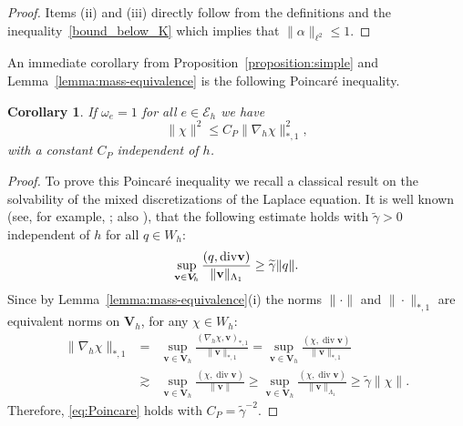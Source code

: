 \documentclass[11pt]{amsart}
\numberwithin{equation}{section}
\newtheorem{corollary}{Corollary}[section]
\theoremstyle{definition}\newtheorem{example}{Example}[section]
\begin{document}
\begin{proof}
Items (ii) and (iii) directly follow from the definitions and
the inequality~\eqref{bound_below_K} which implies that
$\|\alpha\|_{\ell^2}\le 1$.  
\end{proof}

An immediate corollary from Proposition~\ref{proposition:simple}
and Lemma~\ref{lemma:mass-equivalence} is the following  {Poincar\'e } inequality.
\begin{corollary}\label{lemma:Poincare} 
If $\omega_e = 1$ for all $e\in \mathcal{E}_h$ we have 
\begin{equation}\label{eq:Poincare}
\|\chi\|^2 \le C_P\|\nabla_h \chi\|^2_{*,1}, 
\end{equation}
with a constant $C_P$ independent of $h$. 
\end{corollary}
\begin{proof}
  To prove this {Poincar\'e }{} inequality we recall a classical result on the solvability of the
  mixed discretizations of the Laplace equation. It is well known
  (see, for example, \cite[(7.1.28) and Proposition
  5.4.3]{2013BoffiD_BrezziF_FortinM-aa}; also \cite{2002ArnoldD-aa}), that the
  following estimate holds with $\widetilde{\gamma}>0$ independent of
  $h$ for all $q\in W_h$:
\begin{equation}\label{eq:inf-sup-1}
\sup_{{{\mathbf v}}\in {{\boldsymbol V}_{\hspace{-0.2mm}h}}}\frac{(q,{\operatorname{div}} {{\mathbf v}})}{\|{{\mathbf v}}\|_{\Lambda_1}}\ge \widetilde{\gamma}\|q\|. 
\end{equation}
Since by Lemma~\ref{lemma:mass-equivalence}(i) the norms $\|\cdot\|$
and $\|\cdot\|_{*,1}$ are equivalent norms on ${{\boldsymbol V}}_h$, for any
$\chi\in W_h$:
\begin{eqnarray*}
\|\nabla_h \chi\|_{*,1} 
&= &\sup_{{{\mathbf v}}\in {{\boldsymbol V}}_h}\frac{(\nabla_h \chi,{{\mathbf v}})_{*,1}}{\|{{\mathbf v}}\|_{*,1}}
= \sup_{{{\mathbf v}}\in {{\boldsymbol V}}_h}\frac{(\chi,{\operatorname{div}} {{\mathbf v}})}{\|{{\mathbf v}}\|_{*,1}}\\
&\gtrsim& \sup_{{{\mathbf v}}\in {{\boldsymbol V}}_h}\frac{(\chi,{\operatorname{div}} {{\mathbf v}})}{\|{{\mathbf v}}\|}
\ge \sup_{{{\mathbf v}}\in {{\boldsymbol V}}_h}\frac{(\chi,{\operatorname{div}} {{\mathbf v}})}{\|{{\mathbf v}}\|_{\Lambda_1}}
\ge \widetilde{\gamma}\|\chi\|.
\end{eqnarray*}
Therefore, \eqref{eq:Poincare} holds with $C_P=\widetilde{\gamma}^{-2}$. 
\end{proof}
\end{document}
